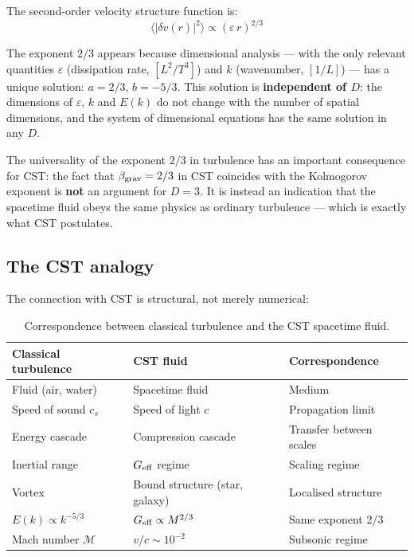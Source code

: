 \documentclass[10pt,a4paper]{article}
\begin{document}
The second-order velocity structure function is:
\begin{equation}
\langle |\delta v(r)|^2 \rangle \propto (\varepsilon\,r)^{2/3}
\end{equation}

The exponent $2/3$ appears because dimensional analysis --- with the only relevant quantities $\varepsilon$ (dissipation rate, $[L^2/T^3]$) and $k$ (wavenumber, $[1/L]$) --- has a unique solution: $a = 2/3$, $b = -5/3$. This solution is \textbf{independent of $D$}: the dimensions of $\varepsilon$, $k$ and $E(k)$ do not change with the number of spatial dimensions, and the system of dimensional equations has the same solution in any $D$.

The universality of the exponent $2/3$ in turbulence has an important consequence for CST: the fact that $\beta_{\rm grav} = 2/3$ in CST coincides with the Kolmogorov exponent is \textbf{not} an argument for $D = 3$. It is instead an indication that the spacetime fluid obeys the same physics as ordinary turbulence --- which is exactly what CST postulates.

\subsection{The CST analogy}

The connection with CST is structural, not merely numerical:

\begin{table}[h]
\centering
\caption{Correspondence between classical turbulence and the CST spacetime fluid.}\label{tab:kolmogorov}
\begin{tabular}{lll}
\toprule
Classical turbulence & CST fluid & Correspondence \\
\midrule
Fluid (air, water) & Spacetime fluid & Medium \\
Speed of sound $c_s$ & Speed of light $c$ & Propagation limit \\
Energy cascade & Compression cascade & Transfer between scales \\
Inertial range & $G_{\rm eff}$ regime & Scaling regime \\
Vortex & Bound structure (star, galaxy) & Localised structure \\
$E(k) \propto k^{-5/3}$ & $G_{\rm eff} \propto M^{2/3}$ & Same exponent 2/3 \\
Mach number $\mathcal{M}$ & $v/c \sim 10^{-2}$ & Subsonic regime \\
\bottomrule
\end{tabular}
\end{table}
\end{document}
